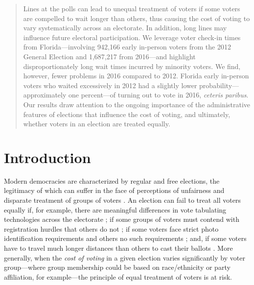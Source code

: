 \documentclass[12pt,titlepage]{article}
\begin{document}
\begin{abstract}
  \noindent 
  Lines at the polls can lead to unequal treatment of voters if some
  voters are compelled to wait longer than others, thus causing the
  cost of voting to vary systematically across an electorate. In
  addition, long lines may influence future electoral participation.
  We leverage voter check-in times from Florida---involving 942,166
  early in-person voters from the 2012 General Election and 1,687,217
  from 2016---and highlight disproportionately long wait times
  incurred by minority voters. We find, however, fewer problems in
  2016 compared to 2012. Florida early in-person voters who waited
  excessively in 2012 had a slightly lower probability---approximately
  one percent---of turning out to vote in 2016, \emph{ceteris
    paribus}.  Our results draw attention to the ongoing importance of
  the administrative features of elections that influence the cost of
  voting, and ultimately, whether voters in an election are treated
  equally.
\end{abstract}



\newpage
\section*{Introduction}

Modern democracies are characterized by regular and free elections,
the legitimacy of which can suffer in the face of perceptions of
unfairness and disparate treatment of groups of voters
\citep{norris2014electoral}.  An election can fail to treat all voters
equally if, for example, there are meaningful differences in vote
tabulating technologies across the electorate
\citep[e.g.,][]{kimballkropf:tech}; if some groups of voters must
contend with registration hurdles that others do not
\cite[e.g.,][]{ansolhersh:registration}; if some voters face strict
photo identification requirements and others no such requirements
\citep[e.g.,][]{benteleetal:newjimcrow}; and, if some voters have to
travel much longer distances than others to cast their ballots
\citep[e.g.,][]{dyckgimpel:distance}.  More generally, when the
\emph{cost of voting} in a given election varies significantly by
voter group---where group membership could be based on race/ethnicity
or party affiliation, for example---the principle of equal treatment
of voters is at risk.
\end{document}
